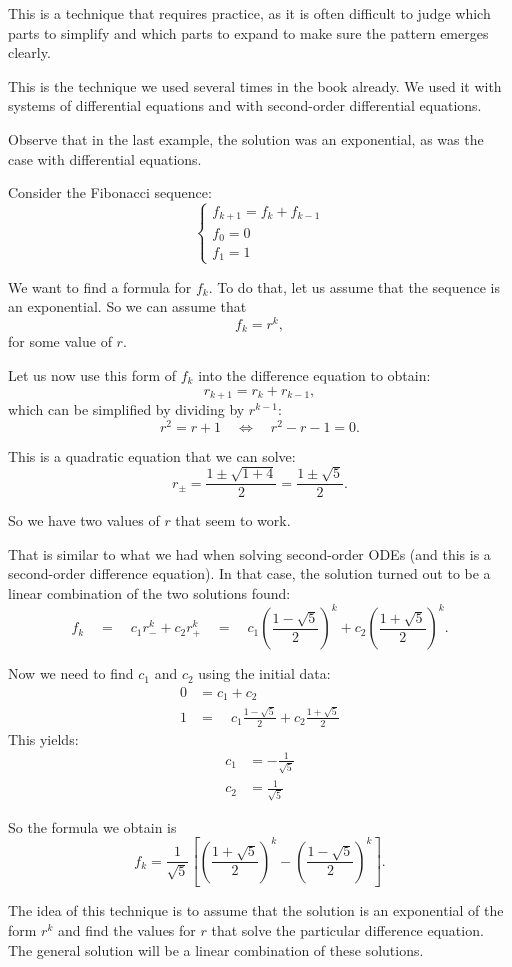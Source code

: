 This is a technique that requires practice, as it is often difficult to judge which parts to simplify and which parts to expand to make sure the pattern emerges clearly. \\







This is the technique we used several times in the book already. We used it with systems of differential equations and with second-order differential equations.

Observe that in the last example, the solution was an exponential, as was the case with differential equations.

\begin{example}
Consider the Fibonacci sequence:
$$
\begin{cases}
f_{k+1} = f_k + f_{k-1} \\
f_0 = 0 \\
f_1 = 1	
\end{cases}
$$

We want to find a formula for $f_k$. To do that, let us assume that the sequence is an exponential. So we can assume that
$$
f_k = r^k,
$$
for some value of $r$.

Let us now use this form of $f_k$ into the difference equation to obtain:
$$
r_{k+1} = r_k + r_{k-1},
$$
which can be simplified by dividing by $r^{k-1}$:
$$
r^2 = r + 1 \quad \Leftrightarrow \quad r^2 - r - 1 = 0.
$$

This is a quadratic equation that we can solve:
$$
r_{\pm} = \frac{1 \pm \sqrt{1 + 4}}{2} = \frac{1 \pm \sqrt{5}}{2}.
$$

So we have two values of $r$ that seem to work. 

That is similar to what we had when solving second-order ODEs (and this is a second-order difference equation).
In that case, the solution turned out to be a linear combination of the two solutions found:
$$
f_k 
	\quad = \quad  c_1 r_-^k + c_2 r_+^k
	\quad = \quad  c_1 \left(\frac{1 - \sqrt{5}}{2}\right)^k + c_2 \left(\frac{1 + \sqrt{5}}{2}\right)^k.
$$

Now we need to find $c_1$ and $c_2$ using the initial data:
\begin{align*}
0 & = c_1 + c_2
	\tag{$k=0$}	 \\
1 & = \quad  c_1 \frac{1 - \sqrt{5}}{2} + c_2 \frac{1 + \sqrt{5}}{2}
	\tag{$k=1$}
\end{align*}
This yields:
\begin{align*}
c_1 & = -\frac{1}{\sqrt{5}}\\
c_2 & = \frac{1}{\sqrt{5}}	
\end{align*}

So the formula we obtain is
$$
f_k =  \frac{1}{\sqrt{5}} \left[\left(\frac{1 + \sqrt{5}}{2}\right)^k - \left(\frac{1 - \sqrt{5}}{2}\right)^k \right].
$$
\end{example}


The idea of this technique is to assume that the solution is an exponential of the form $r^k$ and find the values for $r$ that solve the particular difference equation. The general solution will be a linear combination of these solutions.




